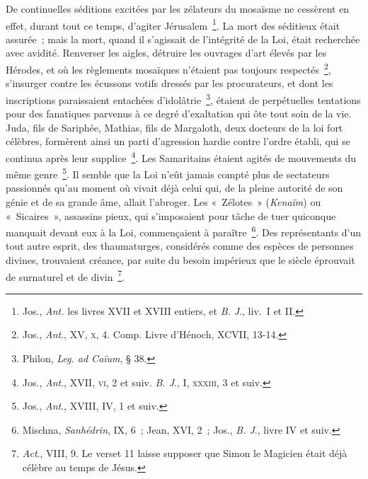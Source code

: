 \documentclass[french,twoside]{book} %
\begin{document}
De continuelles séditions excitées par les zélateurs du mosaïsme ne cessèrent en effet, durant tout ce temps, d’agiter Jérusalem \footnote{ Jos., {\itshape Ant.} les livres XVII et XVIII entiers, et {\itshape B. J}., liv. I et II.}. La mort des séditieux était assurée ; mais la mort, quand il s’agissait de l’intégrité de la Loi, était recherchée avec avidité. Renverser les aigles, détruire les ouvrages d’art élevés par les Hérodes, et où les règlements mosaïques n’étaient pas toujours respectés \footnote{ Jos., {\itshape Ant}., XV, \textsc{x}, 4. Comp. Livre d’Hénoch, XCVII, 13-14.}, s’insurger contre les écussons votifs dressés par les procurateurs, et dont les inscriptions paraissaient entachées d’idolâtrie \footnote{ Philon, {\itshape Leg. ad Caïum}, § 38.}, étaient de perpétuelles tentations pour des fanatiques parvenus à ce degré d’exaltation qui ôte tout soin de la vie. Juda, fils de Sariphée, Mathias, fils de Margaloth, deux docteurs de la loi fort célèbres, formèrent ainsi un parti d’agression hardie contre l’ordre établi, qui se continua après leur supplice \footnote{ Jos., {\itshape Ant}., XVII, \textsc{vi}, 2 et suiv. {\itshape B. J}., I, \textsc{xxxiii}, 3 et suiv.}. Les Samaritains étaient agités de mouvements du même genre \footnote{ Jos., {\itshape Ant}., XVIII, IV, 1 et suiv.}. Il semble que la Loi n’eût jamais compté plus de sectateurs passionnés qu’au moment où vivait déjà celui qui, de la pleine autorité de son génie et de sa grande âme, allait l’abroger. Les « Zélotes » ({\itshape Kenaïm}) ou « Sicaires », assassins pieux, qui s’imposaient pour tâche de tuer quiconque manquait devant eux à la Loi, commençaient à paraître \footnote{ Mischna, {\itshape Sanhédrin}, IX, 6 ; Jean, XVI, 2 ; Jos., {\itshape B. J}., livre IV et suiv.}. Des représentants d’un tout autre esprit, des thaumaturges, considérés comme des espèces de personnes divines, trouvaient créance, par suite du besoin impérieux que le siècle éprouvait de surnaturel et de divin \footnote{{\itshape Act}., VIII, 9. Le verset 11 laisse supposer que Simon le Magicien était déjà célèbre au temps de Jésus.}.\par
\end{document}

